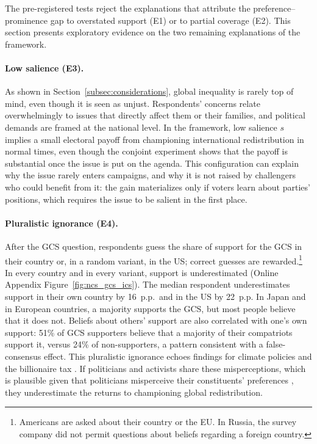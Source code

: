 \documentclass[12pt,english]{article}
\begin{document}
The pre-registered tests reject the explanations that attribute the preference--prominence gap to overstated support (E1) or to partial coverage (E2). This section presents exploratory evidence on the two remaining explanations of the framework.

\paragraph{Low salience (E3).} As shown in Section~\ref{subsec:considerations}, global inequality is rarely top of mind, even though it is seen as unjust. Respondents' concerns relate overwhelmingly to issues that directly affect them or their families, and political demands are framed at the national level. In the framework, low salience $s$ implies a small electoral payoff from championing international redistribution in normal times, even though the conjoint experiment shows that the payoff is substantial once the issue is put on the agenda. This configuration can explain why the issue rarely enters campaigns, and why it is not raised by challengers who could benefit from it: the gain materializes only if voters learn about parties' positions, which requires the issue to be salient in the first place.

\paragraph{Pluralistic ignorance (E4).}\label{subsec:pluralistic} After the GCS question, respondents guess the share of support for the GCS in their country or, in a random variant, in the US; correct guesses are rewarded.\footnote{Americans are asked about their country or the EU. In Russia, the survey company did not permit questions about beliefs regarding a foreign country.} In every country and in every variant, support is underestimated (Online Appendix Figure~\ref{fig:ncs_gcs_ics}). The median respondent underestimates support in their own country by 16~p.p.\ and in the US by 22~p.p. In Japan and in European countries, a majority supports the GCS, but most people believe that it does not. Beliefs about others' support are also correlated with one's own support: 51\% of GCS supporters believe that a majority of their compatriots support it, versus 24\% of non-supporters, a pattern consistent with a false-consensus effect. This pluralistic ignorance echoes findings for climate policies \citep{mildenberger_beliefs_2019,andre_globally_2024} and the billionaire tax \citep{cappelen_majority_2025}. If politicians and activists share these misperceptions, which is plausible given that politicians misperceive their constituents' preferences \citep{broockman_bias_2018,pilet_politicians_2024}, they underestimate the returns to championing global redistribution.
\end{document}
